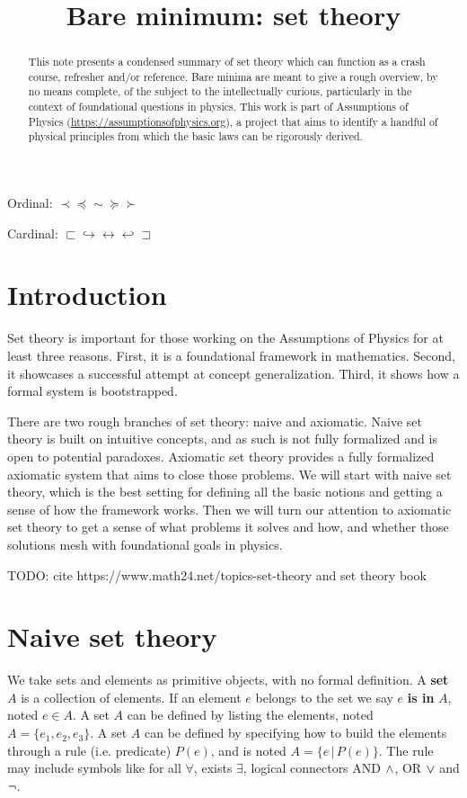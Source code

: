 \documentclass{article}
\title{Bare minimum: set theory}
\date{\vspace{-5ex}}
\def\ordless{\prec}
\def\ordleq{\preceq}
\def\ordeq{\sim}
\def\ordgeq{\succeq}
\def\ordgtr{\succ}
\def\crdless{\sqsubset}
\def\crdleq{\hookrightarrow}
\def\crdeq{\leftrightarrow}
\def\crdgeq{\hookleftarrow}
\def\crdgtr{\sqsupset}
\begin{document}
\maketitle


\begin{abstract}
This note presents a condensed summary of set theory which can function as a crash course, refresher and/or reference. Bare minima are meant to give a rough overview, by no means complete, of the subject to the intellectually curious, particularly in the context of foundational questions in physics. This work is part of Assumptions of Physics (\url{https://assumptionsofphysics.org}), a project that aims to identify a handful of physical principles from which the basic laws can be rigorously derived.
\end{abstract}

Ordinal: $\ordless \ordleq \ordeq \ordgeq \ordgtr$

Cardinal: $\crdless \crdleq \crdeq \crdgeq \crdgtr$


\section{Introduction}

Set theory is important for those working on the Assumptions of Physics for at least three reasons. First, it is a foundational framework in mathematics. Second, it showcases a successful attempt at concept generalization. Third, it shows how a formal system is bootstrapped.

There are two rough branches of set theory: naive and axiomatic. Naive set theory is built on intuitive concepts, and as such is not fully formalized and is open to potential paradoxes. Axiomatic set theory provides a fully formalized axiomatic system that aims to close those problems. We will start with naive set theory, which is the best setting for defining all the basic notions and getting a sense of how the framework works. Then we will turn our attention to axiomatic set theory to get a sense of what problems it solves and how, and whether those solutions mesh with foundational goals  in physics.

TODO: cite https://www.math24.net/topics-set-theory and set theory book

\section{Naive set theory}

We take sets and elements as primitive objects, with no formal definition. A \textbf{set} $A$ is a collection of elements. If an element $e$ belongs to the set we say $e$ \textbf{is in} $A$, noted $ e 
\in A$. A set $A$ can be defined by listing the elements, noted $A = \{ e_1, e_2, e_3 \}$. A set $A$ can be defined by specifying how to build the elements through a rule (i.e. predicate) $P(e)$, and is noted $A = \{e \, | \,  P(e) \}$. The rule may include symbols like for all $\forall$, exists $\exists$, logical connectors AND $\wedge$, OR $\vee$ and $\neg$.
\end{document}
